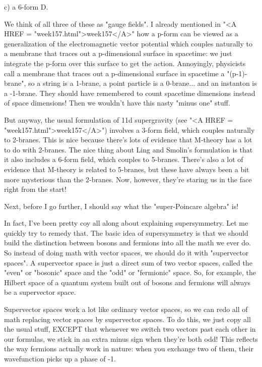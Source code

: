 c) a 6-form D.

We think of all three of these as "gauge fields".  I already
mentioned in "<A HREF = "week157.html">week157</A>" how a
p-form can be viewed as a generalization of the electromagnetic vector
potential which couples naturally to a membrane that traces out a
p-dimensional surface in spacetime: we just integrate the p-form over
this surface to get the action.  Annoyingly, physicists call a membrane
that traces out a p-dimensional surface in spacetime a
"(p-1)-brane", so a string is a 1-brane, a point particle is a
0-brane...  and an instanton is a -1-brane.  They should have remembered
to count spacetime dimensions instead of space dimensions!  Then we
wouldn't have this nasty "minus one" stuff.

But anyway, the usual formulation of 11d supergravity (see "<A HREF
= "week157.html">week157</A>") involves a 3-form field, which
couples naturally to 2-branes.  This is nice because there's lots of
evidence that M-theory has a lot to do with 2-branes.  The nice thing
about Ling and Smolin's formulation is that it also includes a 6-form
field, which couples to 5-branes.  There's also a lot of evidence that
M-theory is related to 5-branes, but these have always been a bit more
mysterious than the 2-branes.  Now, however, they're staring us in the
face right from the start!

Next, before I go further, I should say what the "super-Poincare
algebra" is!  

In fact, I've been pretty coy all along about explaining supersymmetry.
Let me quickly try to remedy that.  The basic idea of supersymmetry is
that we should build the distinction between bosons and fermions into
all the math we ever do.  So instead of doing math with vector spaces,
we should do it with "supervector spaces".  A supervector
space is just a direct sum of two vector spaces, called the
"even" or "bosonic" space and the "odd" or
"fermionic" space.  So, for example, the Hilbert space of a
quantum system built out of bosons and fermions will always be a
supervector space.

Supervector spaces work a lot like ordinary vector spaces, so we can
redo all of math replacing vector spaces by supervector spaces.  To do
this, we just copy all the usual stuff, EXCEPT that whenever we switch
two vectors past each other in our formulas, we stick in an extra minus
sign when they're both odd!  This reflects the way fermions actually
work in nature: when you exchange two of them, their wavefunction picks
up a phase of -1.  

